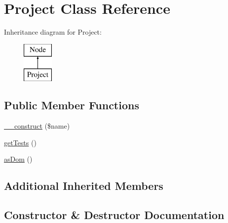 \hypertarget{class_sebastian_bergmann_1_1_code_coverage_1_1_report_1_1_xml_1_1_project}{}\section{Project Class Reference}
\label{class_sebastian_bergmann_1_1_code_coverage_1_1_report_1_1_xml_1_1_project}
Inheritance diagram for Project\+:\begin{figure}[H]
\begin{center}
\leavevmode
\includegraphics[height=2.000000cm]{class_sebastian_bergmann_1_1_code_coverage_1_1_report_1_1_xml_1_1_project}
\end{center}
\end{figure}
\subsection*{Public Member Functions}
\begin{DoxyCompactItemize}
\item 
\mbox{\hyperlink{class_sebastian_bergmann_1_1_code_coverage_1_1_report_1_1_xml_1_1_project_a4717bbfc70a40a57ee741ed70766c309}{\+\_\+\+\_\+construct}} (\$name)
\item 
\mbox{\hyperlink{class_sebastian_bergmann_1_1_code_coverage_1_1_report_1_1_xml_1_1_project_a7e247dd31cc8d37a6c97353a062a0080}{get\+Tests}} ()
\item 
\mbox{\hyperlink{class_sebastian_bergmann_1_1_code_coverage_1_1_report_1_1_xml_1_1_project_a1b81c837661cbe4c672aeeee583f599d}{as\+Dom}} ()
\end{DoxyCompactItemize}
\subsection*{Additional Inherited Members}


\subsection{Constructor \& Destructor Documentation}
\mbox{\label{class_sebastian_bergmann_1_1_code_coverage_1_1_report_1_1_xml_1_1_project_a4717bbfc70a40a57ee741ed70766c309}} 
